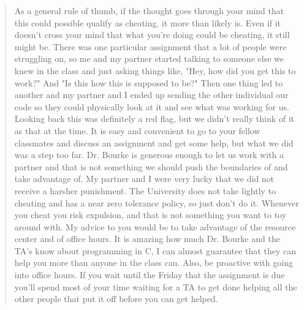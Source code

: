 \documentclass[12pt]{scrartcl}
\begin{document}
\begin{quote}
As a general rule of thumb, if the thought goes through your mind that this could possible qualify as cheating, it more than likely is. Even if it doesn't cross your mind that what you're doing could be cheating, it still might be. There was one particular assignment that a lot of people were struggling on, so me and my partner started talking to someone else we knew in the class and just asking things like, "Hey, how did you get this to work?" And "Is this how this is supposed to be?" Then one thing led to another and my partner and I ended up sending the other individual our code so they could physically look at it and see what was working for us. Looking back this was definitely a red flag, but we didn't really think of it as that at the time. It is easy and convenient to go to your fellow classmates and discuss an assignment and get some help, but what we did was a step too far. Dr. Bourke is generous enough to let us work with a partner and that is not something we should push the boundaries of and take advantage of. My partner and I were very lucky that we did not receive a harsher punishment. The University does not take lightly to cheating and has a near zero tolerance policy, so just don't do it. Whenever you cheat you risk expulsion, and that is not something you want to toy around with.
My advice to you would be to take advantage of the resource center and of office hours. It is amazing how much Dr. Bourke and the TA's know about programming in C, I can almost guarantee that they can help you more than anyone in the class can. Also, be proactive with going into office hours. If you wait until the Friday that the assignment is due you'll spend most
of your time waiting for a TA to get done helping all the other people that put it off before you can get helped.
\end{quote}
\end{document}
